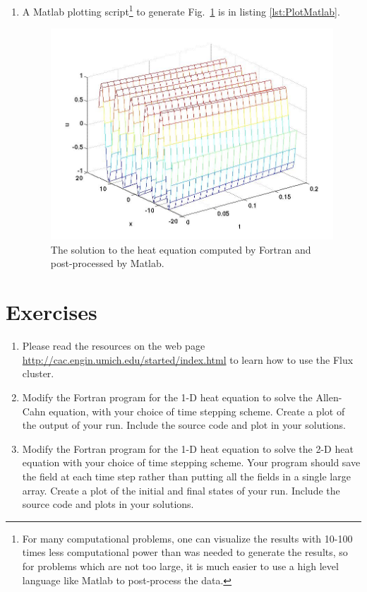 \begin{enumerate}
\item[4)] A Matlab plotting script\footnote{For many computational problems, one can visualize the results with 10-100 times less computational power than was needed to generate the results, so for problems which are not too large, it is much easier to use a high level language like Matlab to post-process the data.} to generate Fig.\ \ref{fig:FortranHeat} is in listing \ref{lst:PlotMatlab}.



\begin{figure}
\begin{center}
\includegraphics[scale=.35]{./FortranPrograms/heatPlot.jpg}
\caption{The solution to the heat equation computed by Fortran and post-processed by Matlab.} \label{fig:FortranHeat}
\end{center}
\end{figure}

\end{enumerate}


\section{Exercises}
\begin{enumerate}
\item[1)] Please read the resources on the web page \url{http://cac.engin.umich.edu/started/index.html} to learn how to use the Flux cluster.
\item[2)] Modify the Fortran program for the 1-D heat equation to solve the Allen-Cahn equation, with your choice of time stepping scheme. Create a plot of the output of your run. Include the source code and plot in your solutions.
\item[3)] Modify the Fortran program for the 1-D heat equation to solve the  2-D heat equation with your choice of time stepping scheme. Your program should save the field at each time step rather than putting all the fields in a single large array. Create a plot of the initial and final states of your run. Include the source code and plots in your solutions.
\end{enumerate}

